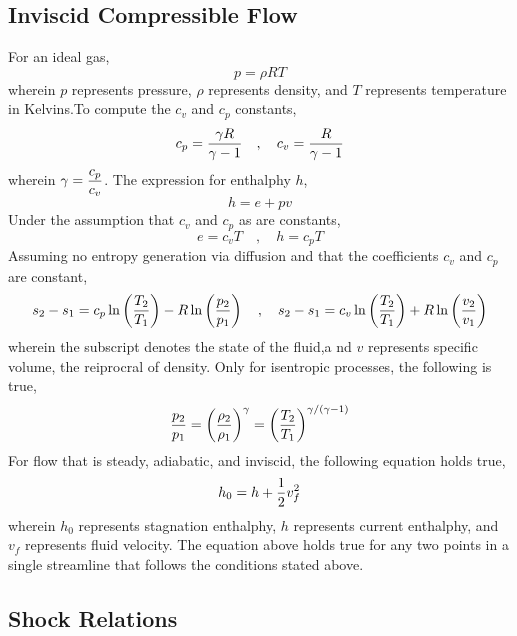 \documentclass[class=report, 12pt, crop=false]{standalone}
\begin{document}
\begin{center}
\chapter{Inviscid Compressible Flow}
\begin{comment}
\end{comment}
\begin{comment}
\end{comment}
For an ideal gas, 
$$p = \rho R T$$ 
wherein $p$ represents pressure, $\rho$ represents density, and $T$ represents temperature in Kelvins.To compute the $c_v$ and $c_p$ constants,
$$c_p = \frac{\gamma R}{\gamma - 1}\quad,\quad c_v = \frac{R}{\gamma-1}$$
wherein $\displaystyle{\gamma= \frac{c_p}{c_v}}$. The expression for enthalphy $h$,
$$h = e + pv$$
Under the assumption that $c_v$ and $c_p$ as are constants,
$$e = c_v T\quad,\quad h = c_p T$$
Assuming no entropy generation via diffusion and that the coefficients $c_v$ and $c_p$ are constant,
$$s_2-s_1 = c_p\ln\left(\frac{T_2}{T_1}\right)-R\ln\left(\frac{p_2}{p_1}\right) \quad,\quad s_2-s_1 = c_v\ln\left(\frac{T_2}{T_1}\right) + R\ln\left(\frac{v_2}{v_1}\right)$$
wherein the subscript denotes the state of the fluid,a nd $v$ represents specific volume, the reiprocral of density. Only for isentropic processes, the following is true,
$$\frac{p_2}{p_1} = \left(\frac{\rho_2}{\rho_1}\right)^\gamma = \left(\frac{T_2}{T_1}\right)^{\gamma/(\gamma-1)}$$
For flow that is steady, adiabatic, and inviscid, the following equation holds true,
$$h_0 = h + \frac{1}{2}v_f^2$$
wherein $h_0$ represents stagnation enthalphy, $h$ represents current enthalphy, and $v_f$ represents fluid velocity. The equation above holds true for any two points in a single streamline that follows the conditions stated above.
\section{Shock Relations}
\begin{comment}
\end{comment}

\end{center}
\end{document}
